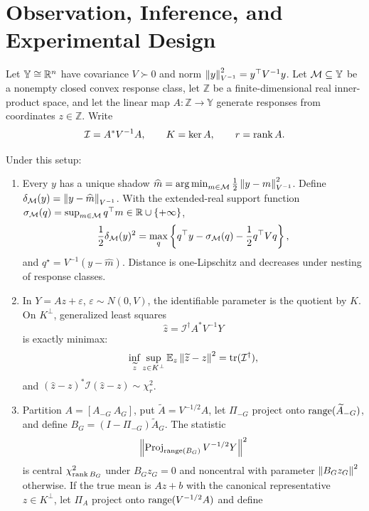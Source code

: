 \section{Observation, Inference, and Experimental Design}
\label{sec:observation-design}

Let $\mathbb Y\cong\mathbb R^n$ have covariance $V\succ0$ and norm $\left\lVert y\right\rVert_{V^{-1}}^2=y^\top V^{-1}y$.  Let $\mathcal M\subseteq\mathbb Y$ be a nonempty closed convex response class, let $\mathbb Z$ be a finite-dimensional real inner-product space, and let the linear map $A:\mathbb Z\to\mathbb Y$ generate responses from coordinates $z\in\mathbb Z$.  Write
\[
\mathcal I=A^*V^{-1}A,
\qquad K=\ker A,
\qquad r=\operatorname{rank} A.
\]

\begin{theorem}
\label{thm:projection-information-decision}
Under this setup:
\begin{enumerate}[leftmargin=*,itemsep=4pt,label=(\roman*)]
\item Every $y$ has a unique shadow $\widehat m=\operatorname*{arg\,min}_{m\in\mathcal M}\frac12\left\lVert y-m\right\rVert_{V^{-1}}^2$.  Define $\delta_{\mathcal M}(y)=\left\lVert y-\widehat m\right\rVert_{V^{-1}}$.  With the extended-real support function $\sigma_{\mathcal M}(q)=\sup_{m\in\mathcal M}q^\top m\in\mathbb R\cup\{+\infty\}$,
\begin{equation}
\frac12\delta_{\mathcal M}(y)^2
=\max_q\left\{q^\top y-\sigma_{\mathcal M}(q)-\frac12q^\top Vq\right\},
\label{eq:master-projection-dual}
\end{equation}
and $q^\star=V^{-1}(y-\widehat m)$.  Distance is one-Lipschitz and decreases under nesting of response classes.
\item In $Y=Az+\varepsilon$, $\varepsilon\sim N(0,V)$, the identifiable parameter is the quotient by $K$.  On $K^\perp$, generalized least squares
\[
\widehat z=\mathcal I^\dagger A^*V^{-1}Y
\]
is exactly minimax:
\begin{equation}
\inf_{\widetilde z}\sup_{z\in K^\perp}\mathbb E_z\left\lVert \widetilde z-z\right\rVert^2
=\operatorname{tr}(\mathcal I^\dagger),
\label{eq:master-minimax-risk}
\end{equation}
and $(\widehat z-z)^*\mathcal I(\widehat z-z)\sim\chi_r^2$.
\item Partition $A=[A_{-G}\ A_G]$, put $\widetilde A=V^{-1/2}A$, let $\Pi_{-G}$ project onto $\operatorname{range}(\widetilde A_{-G})$, and define $B_G=(I-\Pi_{-G})\widetilde A_G$.  The statistic
\[
\left\lVert \operatorname{Proj}_{\operatorname{range}(B_G)}V^{-1/2}Y\right\rVert^2
\]
is central $\chi^2_{\operatorname{rank} B_G}$ under $B_Gz_G=0$ and noncentral with parameter $\left\lVert B_Gz_G\right\rVert^2$ otherwise.  If the true mean is $Az+b$ with the canonical representative $z\in K^\perp$, let $\Pi_A$ project onto $\operatorname{range}(V^{-1/2}A)$ and define

\end{enumerate}
\end{theorem}
